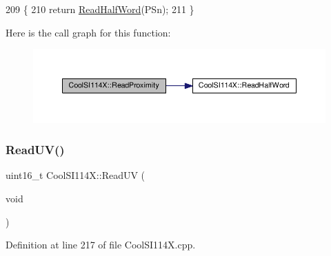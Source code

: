 \begin{DoxyCode}
209 \{
210   \textcolor{keywordflow}{return} \hyperlink{class_cool_s_i114_x_a1d25c9e137874af529804c2ec796a6b9}{ReadHalfWord}(PSn);     
211 \}
\end{DoxyCode}
Here is the call graph for this function\+:\nopagebreak
\begin{figure}[H]
\begin{center}
\leavevmode
\includegraphics[width=350pt]{dd/d67/class_cool_s_i114_x_a194fede1105508c7803dbb567cbdcc67_cgraph}
\end{center}
\end{figure}
\mbox{\label{class_cool_s_i114_x_a14ced664d74e93438440b0274109c111}} 
\subsubsection{\texorpdfstring{Read\+U\+V()}{ReadUV()}}
{\footnotesize\ttfamily uint16\+\_\+t Cool\+S\+I114\+X\+::\+Read\+UV (\begin{DoxyParamCaption}\item[{void}]{ }\end{DoxyParamCaption})}



Definition at line 217 of file Cool\+S\+I114\+X.\+cpp.


